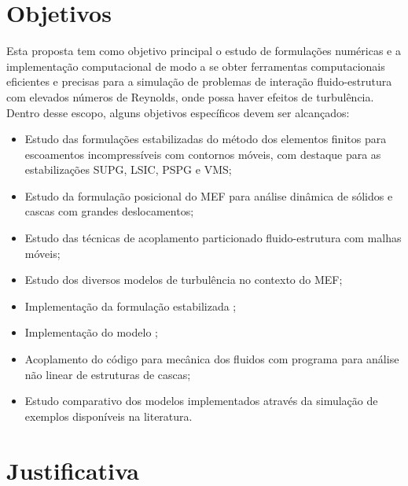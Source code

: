 
\section{Objetivos}

Esta proposta tem como objetivo principal o estudo de formulações numéricas e a implementação computacional de modo a se obter ferramentas computacionais eficientes e precisas para a simulação de problemas de interação fluido-estrutura com elevados números de Reynolds, onde possa haver efeitos de turbulência. Dentro desse escopo, alguns objetivos específicos devem ser alcançados:

\begin{itemize}
    \item Estudo das formulações estabilizadas do método dos elementos finitos para escoamentos incompressíveis com contornos móveis, com destaque para as estabilizações SUPG, LSIC, PSPG e VMS;

    \item Estudo da formulação posicional do MEF para análise dinâmica de sólidos e cascas com grandes deslocamentos;

    \item Estudo das técnicas de acoplamento particionado fluido-estrutura com malhas móveis;

    \item Estudo dos diversos modelos de turbulência no contexto do MEF;

    \item Implementação da formulação estabilizada \VMS;

    \item Implementação do modelo \LES;

    \item Acoplamento do código para mecânica dos fluidos com programa para análise não linear de estruturas de cascas;

    \item Estudo comparativo dos modelos implementados através da simulação de exemplos disponíveis na literatura.
\end{itemize}

\section{Justificativa}


